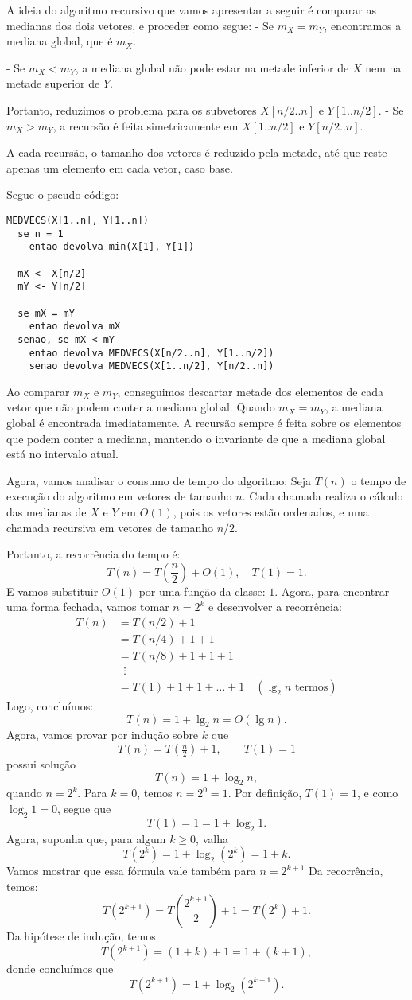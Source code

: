 \documentclass[a4paper,12pt]{article}
\begin{document}
A ideia do algoritmo recursivo que vamos apresentar a seguir é comparar as medianas dos dois vetores, e proceder como segue:
- Se $m_X = m_Y$, encontramos a mediana global, que é $m_X$. 

- Se $m_X < m_Y$, a mediana global não pode estar na metade inferior de $X$ nem na metade superior de $Y$.  

Portanto, reduzimos o problema para os subvetores $X[n/2..n]$ e $Y[1..n/2]$.  
- Se $m_X > m_Y$, a recursão é feita simetricamente em $X[1..n/2]$ e $Y[n/2..n]$.  

A cada recursão, o tamanho dos vetores é reduzido pela metade, até que reste apenas um elemento em cada vetor, caso base.

Segue o pseudo-código:

\begin{lstlisting}
MEDVECS(X[1..n], Y[1..n])
  se n = 1
  	entao devolva min(X[1], Y[1])

  mX <- X[n/2]
  mY <- Y[n/2]

  se mX = mY
  	entao devolva mX
  senao, se mX < mY
  	entao devolva MEDVECS(X[n/2..n], Y[1..n/2])
  	senao devolva MEDVECS(X[1..n/2], Y[n/2..n])
\end{lstlisting}

Ao comparar $m_X$ e $m_Y$, conseguimos descartar metade dos elementos de cada vetor que não podem conter a mediana global.  Quando $m_X = m_Y$, a mediana global é encontrada imediatamente.  A recursão sempre é feita sobre os elementos que podem conter a mediana, mantendo o invariante de que a mediana global está no intervalo atual.

Agora, vamos analisar o consumo de tempo do algoritmo: 
Seja $T(n)$ o tempo de execução do algoritmo em vetores de tamanho $n$. Cada chamada realiza o cálculo das medianas de $X$ e $Y$ em $O(1)$, pois os vetores estão ordenados, e uma chamada recursiva em vetores de tamanho $n/2$.

Portanto, a recorrência do tempo é:
\[
T(n) = T\left(\frac{n}{2}\right) + O(1), \quad T(1) = 1.
\]
E vamos substituir $O(1)$ por uma função da classe: $1$. Agora, para encontrar uma forma fechada, vamos tomar $n = 2^k$ e desenvolver a recorrência:
\begin{align*}
	T(n) &= T(n/2) + 1 \\
	&= T(n/4) + 1 + 1 \\
	&= T(n/8) + 1 + 1 + 1 \\
	&\;\;\vdots \\
	&= T(1) + 1 + 1 + \dots + 1 \quad (\text{$\lg_2 n$ termos})
\end{align*}
Logo, concluímos:
\[ T(n) = 1 + \lg_2 n = O(\lg n). \]
Agora, vamos provar por indução sobre $k$ que
\[ T(n) = T\!\left(\tfrac{n}{2}\right) + 1, \qquad T(1) = 1 \]
possui solução
\[ T(n) = 1 + \log_2 n, \]
quando $n = 2^k$. Para $k=0$, temos $n=2^0=1$. Por definição, $T(1)=1$, e como $\log_2 1 = 0$, segue que
\[ T(1) = 1 = 1 + \log_2 1. \]
Agora, suponha que, para algum $k \geq 0$, valha
\[ T(2^k) = 1 + \log_2 (2^k) = 1 + k. \] 
Vamos mostrar que essa fórmula vale também para $n = 2^{k+1}$ Da recorrência, temos:
\[ T(2^{k+1}) = T\!\left(\frac{2^{k+1}}{2}\right) + 1 = T(2^k) + 1. \]
Da hipótese de indução, temos
\[ T(2^{k+1}) = (1+k) + 1 = 1 + (k+1), \]
donde concluímos que
\[ T(2^{k+1}) = 1 + \log_2 (2^{k+1}). \]
\end{document}
